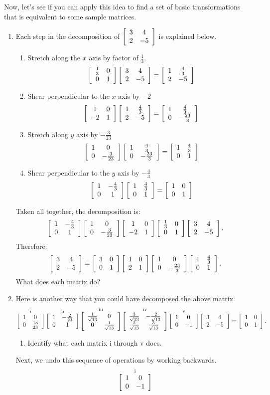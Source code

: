 \documentclass[../gatm.tex]{subfiles}
\begin{document}
Now, let's see if you can apply this idea to find a set of basic transformations that is equivalent to some sample matrices.

\begin{enumerate}
\item Each step in the decomposition of $\twomat{3}{4}{2}{-5}$ is explained below.
\begin{multicols}{2}
\begin{enumerate}[label=(\roman*)]
\item Stretch along the $x$ axis by factor of $\frac{1}{3}$.
$$\twomat{\frac{1}{3}}{0}{0}{1}\twomat{3}{4}{2}{-5}=\twomat{1}{\frac{4}{3}}{2}{-5}$$
\item Shear perpendicular to the $x$ axis by $-2$
$$\twomat{1}{0}{-2}{1}\twomat{1}{\frac{4}{3}}{2}{-5}=\twomat{1}{\frac{4}{3}}{0}{-\frac{23}{3}}$$
\item Stretch along $y$ axis by $-\frac{3}{23}$
$$\twomat{1}{0}{0}{-\frac{3}{23}}\twomat{1}{\frac{4}{3}}{0}{-\frac{23}{3}}=\twomat{1}{\frac{4}{3}}{0}{1}$$
\item Shear perpendicular to the $y$ axis by $-\frac{4}{3}$
$$\twomat{1}{-\frac{4}{3}}{0}{1}\twomat{1}{\frac{4}{3}}{0}{1}=\twomat{1}{0}{0}{1}$$
\end{enumerate}
\end{multicols}
Taken all together, the decomposition is:
$$\twomat{1}{-\frac{4}{3}}{0}{1}\twomat{1}{0}{0}{-\frac{3}{23}}\twomat{1}{0}{-2}{1}\twomat{\frac{1}{3}}{0}{0}{1}\twomat{3}{4}{2}{-5}.$$
Therefore: $$\twomat{3}{4}{2}{-5}=\twomat{3}{0}{0}{1}\twomat{1}{0}{2}{1}\twomat{1}{0}{0}{-\frac{23}{3}}\twomat{1}{\frac{4}{3}}{0}{1}.$$ What does each matrix do?
\item Here is another way that you could have decomposed the above matrix.
\vspace{-2ex}
$$\mathop{\twomat{1}{0}{0}{\frac{13}{23}}}^{\text{i}}
\mathop{\twomat{1}{-\frac{2}{23}}{0}{1}}^{\text{ii}}
\mathop{\twomat{\frac{1}{\sqrt{13}}}{0}{0}{\frac{1}{\sqrt{13}}}}^{\text{iii}}
\mathop{\twomat{\frac{3}{\sqrt{13}}}{-\frac{2}{\sqrt{13}}}{\frac{2}{\sqrt{13}}}{\frac{3}{\sqrt{13}}}}^{\text{iv}}
\mathop{\twomat{1}{0}{0}{-1}}^{\text{v}}
\twomat{3}{4}{2}{-5}=\twomat{1}{0}{0}{1}.$$
\begin{enumerate}
\item Identify what each matrix i through v does.
\end{enumerate}
Next, we undo this sequence of operations by working backwards.
\vspace{-2ex}
$$\mathop{\twomat{1}{0}{0}{-1}}^{\text{i}}
$$
\end{enumerate}
\end{document}
